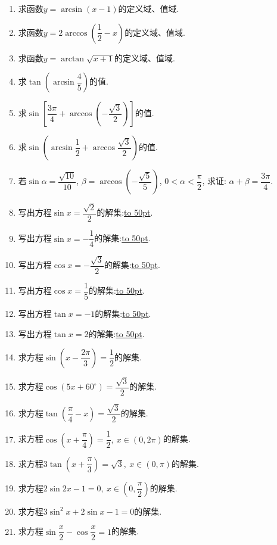 \documentclass[10pt,a4paper]{article}
\newcommand{\blank}[1]{\underline{\hbox to #1pt{}}}
\begin{document}
\begin{enumerate}[1.]
\begin{center}
\end{center}
\item 求函数$y=\arcsin (x-1)$的定义域、值域.
\item 求函数$y=2\arccos (\dfrac 12-x)$的定义域、值域.
\item 求函数$y=\arctan \sqrt {x+1}$的定义域、值域.
\item 求$\tan (\arcsin \dfrac 45)$的值.
\item 求$\sin [\dfrac{3\pi}4+\arccos (-\dfrac{\sqrt 3}2)]$的值.
\item 求$\sin (\arcsin \dfrac 12+\arccos \dfrac{\sqrt 3}2)$的值.
\item 若$\sin \alpha =\dfrac{\sqrt {10}}{10}$, $\beta =\arccos (-\dfrac{\sqrt 5}5)$, $0<\alpha <\dfrac{\pi}2$, 求证: $\alpha +\beta =\dfrac{3\pi}4$.
\item 写出方程$\sin x=\dfrac{\sqrt 2}2$的解集:\blank{50}.
\item 写出方程$\sin x=-\dfrac 14$的解集:\blank{50}.
\item 写出方程$\cos x=-\dfrac{\sqrt 3}2$的解集:\blank{50}.
\item 写出方程$\cos x=\dfrac 15$的解集:\blank{50}.
\item 写出方程$\tan x=-1$的解集:\blank{50}.
\item 写出方程$\tan x=2$的解集:\blank{50}.
\item 求方程$\sin (x-\dfrac{2\pi}3)=\dfrac 12$的解集.
\item 求方程$\cos (5x+60^\circ)=\dfrac{\sqrt 3}2$的解集.
\item 求方程$\tan (\dfrac{\pi}4-x)=\dfrac{\sqrt 3}2$的解集.
\item 求方程$\cos (x+\dfrac{\pi}4)=\dfrac 12, \ x\in (0,2\pi)$的解集.
\item 求方程$3\tan (x+\dfrac{\pi}3)=\sqrt 3, \ x\in (0,\pi)$的解集.
\item 求方程$2\sin 2x-1=0, \ x\in (0,\dfrac{\pi}2)$的解集.
\item 求方程$3\sin ^2x+2\sin x-1=0$的解集.
\item 求方程$\sin \dfrac x2-\cos \dfrac x2=1$的解集.

\end{enumerate}
\end{document}
